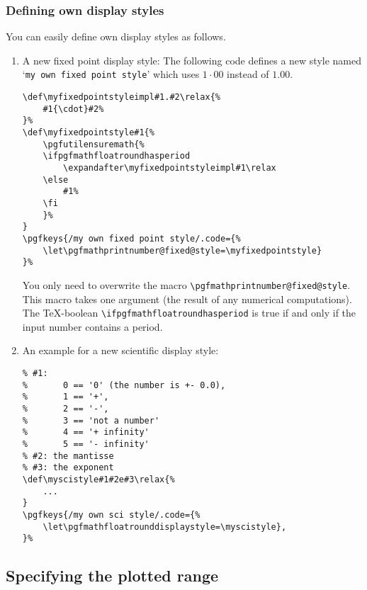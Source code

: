 \subsubsection{Defining own display styles}
You can easily define own display styles as follows.
\begin{enumerate}
	\item A new fixed point display style: The following code defines a new style named `\texttt{my own fixed point style}' which uses $1{\cdot}00$ instead of $1.00$.
\begin{lstlisting}
\def\myfixedpointstyleimpl#1.#2\relax{%
	#1{\cdot}#2%
}%
\def\myfixedpointstyle#1{%
	\pgfutilensuremath{%
	\ifpgfmathfloatroundhasperiod
		\expandafter\myfixedpointstyleimpl#1\relax
	\else
		#1%
	\fi
	}%
}
\pgfkeys{/my own fixed point style/.code={%
	\let\pgfmathprintnumber@fixed@style=\myfixedpointstyle}
}%
\end{lstlisting}
	You only need to overwrite the macro \lstinline!\pgfmathprintnumber@fixed@style!. This macro takes one argument (the result of any numerical computations). The \TeX-boolean \lstinline!\ifpgfmathfloatroundhasperiod! is true if and only if the input number contains a period.

	\item An example for a new scientific display style:
\begin{lstlisting}
% #1:
% 		0 == '0' (the number is +- 0.0),
% 		1 == '+', 
% 		2 == '-',
% 		3 == 'not a number'
% 		4 == '+ infinity'
% 		5 == '- infinity'
% #2: the mantisse
% #3: the exponent
\def\myscistyle#1#2e#3\relax{%
	...
}
\pgfkeys{/my own sci style/.code={%
	\let\pgfmathfloatrounddisplaystyle=\myscistyle},
}%
\end{lstlisting}
\end{enumerate}
\endgroup




\subsection{Specifying the plotted range}

